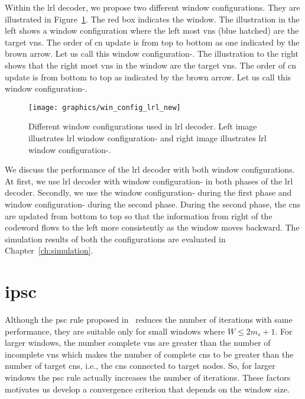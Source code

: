 Within the \gls{lrl} decoder, we propose two different window configurations. They are illustrated in Figure~\ref{fig:win_config_lrl}. The red box indicates the window. The illustration in the left shows a window configuration where the left most \glspl{vn} (blue hatched) are the target \glspl{vn}. The order of \gls{cn} update is from top to bottom as one indicated by the brown arrow. Let us call this window configuration-. The illustration to the right shows that the right most \glspl{vn} in the window are the target \glspl{vn}. The order of \gls{cn} update is from bottom to top as indicated by the brown arrow. Let us call this window configuration-.

\begin{figure}[htbp]
  \centering
  \texttt{[image: graphics/win\_config\_lrl\_new]}
  \caption[Different window configurations used in \acrshort{lrl} decoder.]{Different window configurations used in \gls{lrl} decoder. Left image illustrates \gls{lrl} window configuration- and right image illustrates \gls{lrl} window configuration-.}
  \label{fig:win_config_lrl}
\end{figure}

We discuss the performance of the \gls{lrl} decoder with both window configurations. At first, we use \gls{lrl} decoder with window configuration- in both phases of the \gls{lrl} decoder. Secondly, we use the window configuration- during the first phase and window configuration- during the second phase. During the second phase, the \glspl{cn} are updated from bottom to top so that the information from right of the codeword flows to the left more consistently as the window moves backward. The simulation results of both the configurations are evaluated in Chapter~\ref{ch:simulation}.

\section{\texorpdfstring{\acrlong{ipsc}}{IPSC}}
Although the \gls{psc} rule proposed in~\cite{Kang2018} reduces the number of iterations with same performance, they are suitable only for small windows where $W\leq 2m_s+1$. For larger windows, the number complete \glspl{vn} are greater than the number of incomplete \glspl{vn} which makes the number of complete \glspl{cn} to be greater than the number of target \glspl{cn}, i.e., the \glspl{cn} connected to target nodes. So, for larger windows the \gls{psc} rule actually increases the number of iterations. These factors motivates us develop a convergence criterion that depends on the window size.

